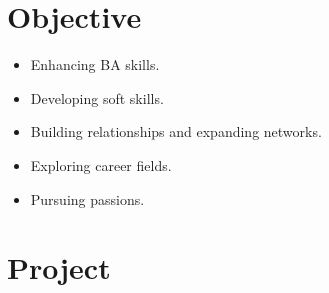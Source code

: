 \documentclass[letterpaper]{twentysecondcv} %
\begin{document}
\section{Objective}
\begin{itemize}[label=-, leftmargin=0.25cm]
    \item Enhancing BA skills.
    \item Developing soft skills.
    \item Building relationships and expanding networks.
    \item Exploring career fields.
    \item Pursuing passions.
\end{itemize}
\vspace{0.5cm}

\section{Project}

\begin{project1}
    
\end{project1}


\newpage 

\makeprofile 
\begin{project4}
    
\end{project4}
\vspace{0.5cm}
\begin{project2}
    
\end{project2}
\vspace{0.5cm}
\begin{project3}
    
\end{project3}
\end{document}
